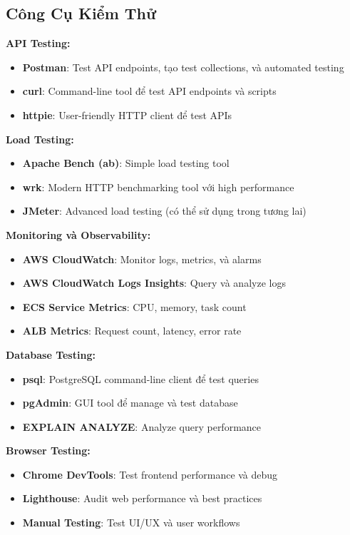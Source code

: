 \subsection{Công Cụ Kiểm Thử}

\textbf{API Testing:}
\begin{itemize}
    \item \textbf{Postman}: Test API endpoints, tạo test collections, và automated testing
    \item \textbf{curl}: Command-line tool để test API endpoints và scripts
    \item \textbf{httpie}: User-friendly HTTP client để test APIs
\end{itemize}

\textbf{Load Testing:}
\begin{itemize}
    \item \textbf{Apache Bench (ab)}: Simple load testing tool
    \item \textbf{wrk}: Modern HTTP benchmarking tool với high performance
    \item \textbf{JMeter}: Advanced load testing (có thể sử dụng trong tương lai)
\end{itemize}

\textbf{Monitoring và Observability:}
\begin{itemize}
    \item \textbf{AWS CloudWatch}: Monitor logs, metrics, và alarms
    \item \textbf{AWS CloudWatch Logs Insights}: Query và analyze logs
    \item \textbf{ECS Service Metrics}: CPU, memory, task count
    \item \textbf{ALB Metrics}: Request count, latency, error rate
\end{itemize}

\textbf{Database Testing:}
\begin{itemize}
    \item \textbf{psql}: PostgreSQL command-line client để test queries
    \item \textbf{pgAdmin}: GUI tool để manage và test database
    \item \textbf{EXPLAIN ANALYZE}: Analyze query performance
\end{itemize}

\textbf{Browser Testing:}
\begin{itemize}
    \item \textbf{Chrome DevTools}: Test frontend performance và debug
    \item \textbf{Lighthouse}: Audit web performance và best practices
    \item \textbf{Manual Testing}: Test UI/UX và user workflows
\end{itemize}

